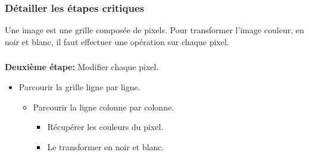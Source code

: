 \documentclass[svgnames,11pt]{beamer}
\begin{document}
\begin{frame}
    \frametitle{Détailler les étapes critiques}

    Une image est une grille composée de pixels. Pour transformer l'image couleur, en noir et blanc, il faut effectuer une opération sur chaque pixel.
    \begin{center}
        \label{matrice}
    \end{center}

\end{frame}
\begin{frame}
    \frametitle{}

    \textbf{Deuxième étape:} Modifier chaque pixel.
    \begin{center}
        \label{matrice}
    \end{center}
    \begin{itemize}
        \item Parcourir la grille ligne par ligne.
              \begin{itemize}
                  \item Parcourir la ligne colonne par colonne.
                        \begin{itemize}
                            \item Récupérer les couleurs du pixel.
                            \item Le transformer en noir et blanc.
                        \end{itemize}
              \end{itemize}
    \end{itemize}

\end{frame}
\end{document}
